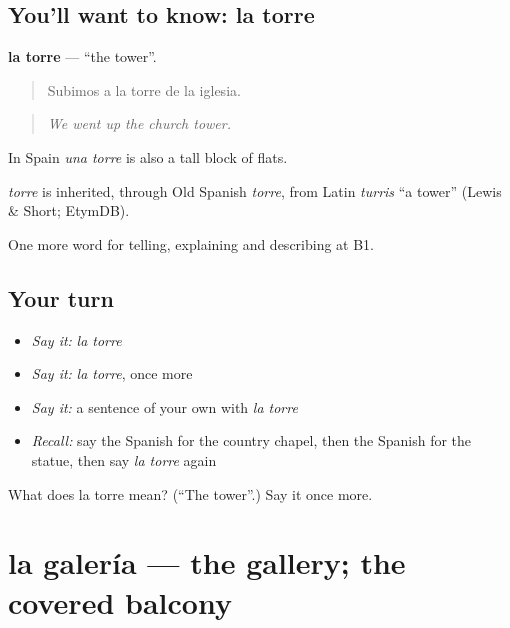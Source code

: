 \subsection*{You'll want to know: la torre}
\textbf{la torre} — \textquotedblleft{}the tower\textquotedblright{}.

\begin{quote}
Subimos a la torre de la iglesia.
\end{quote}

\begin{quote}
\emph{We went up the church tower.}
\end{quote}

In Spain \emph{una torre} is also a tall block of flats.

\begin{cousinweb}
\emph{torre} is inherited, through Old Spanish \emph{torre}, from Latin \emph{turris} \textquotedblleft{}a tower\textquotedblright{} (Lewis \& Short; EtymDB).
\end{cousinweb}

\begin{grammarlens}[title={What you've built}]
One more word for telling, explaining and describing at B1.
\end{grammarlens}

\subsection*{Your turn}
\begin{itemize}
\raggedright
  \item \emph{Say it:} \emph{la torre}
  \item \emph{Say it:} \emph{la torre}, once more
  \item \emph{Say it:} a sentence of your own with \emph{la torre}
  \item \emph{Recall:} say the Spanish for the country chapel, then the Spanish for the statue, then say \emph{la torre} again
\end{itemize}

\begin{tcolorbox}[breakable,colback=teal!4,colframe=teal!35!black,title={Before you move on}]
What does la torre mean? (\textquotedblleft{}The tower\textquotedblright{}.) Say it once more.
\end{tcolorbox}
\section[la galería]{la galería — the gallery; the covered balcony}

